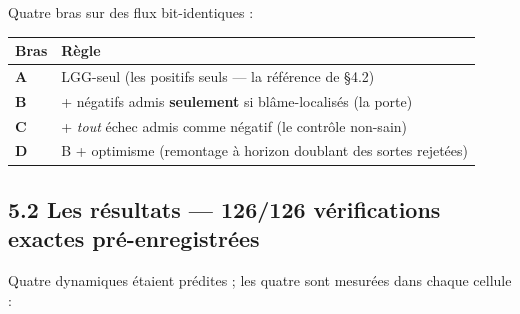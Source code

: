 \documentclass[11pt]{article}
\begin{document}
Quatre bras sur des flux bit-identiques :

\begin{center}\small\begin{tabular}{ll}\toprule
Bras & Règle \\ \midrule
\textbf{A} & LGG-seul (les positifs seuls — la référence de §4.2) \\
\textbf{B} & + négatifs admis \textbf{seulement} si blâme-localisés (la porte) \\
\textbf{C} & + \emph{tout} échec admis comme négatif (le contrôle non-sain) \\
\textbf{D} & B + optimisme (remontage à horizon doublant des sortes rejetées) \\
\bottomrule\end{tabular}\end{center}

\subsection*{5.2 Les résultats — 126/126 vérifications exactes pré-enregistrées}

Quatre dynamiques étaient prédites ; les quatre sont mesurées dans chaque cellule :
\end{document}
